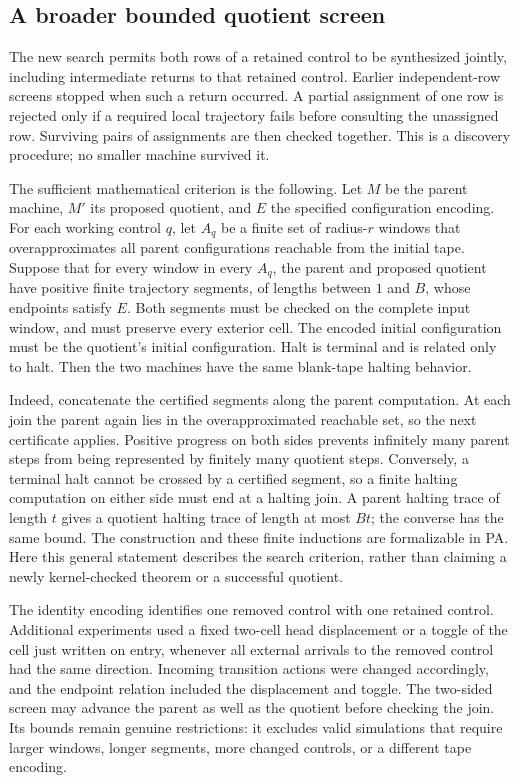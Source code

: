 \subsection{A broader bounded quotient screen}
The new search permits both rows of a retained control to be synthesized jointly,
including intermediate returns to that retained control.  Earlier independent-row
screens stopped when such a return occurred.  A partial assignment of one row
is rejected only if a required local trajectory fails before consulting the
unassigned row.  Surviving pairs of assignments are then checked together.
This is a discovery procedure; no smaller machine survived it.

The sufficient mathematical criterion is the following.  Let $M$ be the parent
machine, $M'$ its proposed quotient, and $E$ the specified configuration encoding.
For each working control $q$, let $A_q$ be a finite set of radius-$r$ windows
that overapproximates all parent configurations reachable from the initial tape.
Suppose that for every window in every $A_q$, the parent and proposed quotient
have positive finite trajectory segments, of lengths between $1$ and $B$, whose
endpoints satisfy $E$.  Both segments must be checked on the complete input
window, and must preserve every exterior cell.  The encoded initial configuration
must be the quotient's initial configuration.  Halt is terminal and is related
only to halt.  Then the two machines have the same blank-tape halting behavior.

Indeed, concatenate the certified segments along the parent computation.  At each
join the parent again lies in the overapproximated reachable set, so the next
certificate applies.  Positive progress on both sides prevents infinitely many
parent steps from being represented by finitely many quotient steps.  Conversely,
a terminal halt cannot be crossed by a certified segment, so a finite halting
computation on either side must end at a halting join.  A parent halting trace of
length $t$ gives a quotient halting trace of length at most $Bt$; the converse has
the same bound.  The construction and these finite inductions are formalizable
in PA.  Here this general statement describes the search criterion, rather than
claiming a newly kernel-checked theorem or a successful quotient.

The identity encoding identifies one removed control with one retained control.
Additional experiments used a fixed two-cell head displacement or a toggle of
the cell just written on entry, whenever all external arrivals to the removed
control had the same direction.  Incoming transition actions were changed
accordingly, and the endpoint relation included the displacement and toggle.
The two-sided screen may advance the parent as well as the quotient before
checking the join.  Its bounds remain genuine restrictions: it excludes valid
simulations that require larger windows, longer segments, more changed controls,
or a different tape encoding.
